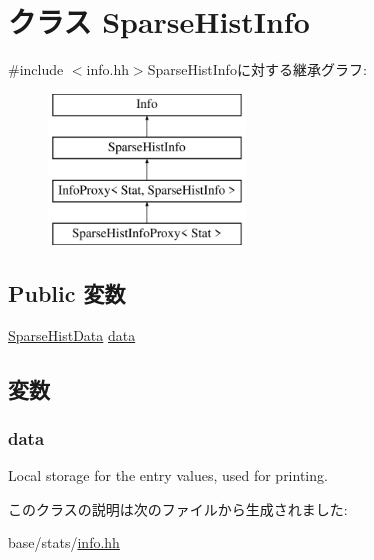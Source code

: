 \hypertarget{classStats_1_1SparseHistInfo}{
\section{クラス SparseHistInfo}
\label{classStats_1_1SparseHistInfo}
}


{\ttfamily \#include $<$info.hh$>$}SparseHistInfoに対する継承グラフ:\begin{figure}[H]
\begin{center}
\leavevmode
\includegraphics[height=4cm]{classStats_1_1SparseHistInfo}
\end{center}
\end{figure}
\subsection*{Public 変数}
\begin{DoxyCompactItemize}
\item 
\hyperlink{structStats_1_1SparseHistData}{SparseHistData} \hyperlink{classStats_1_1SparseHistInfo_a7ef9716232ae99114f53b4f29a9f57bf}{data}
\end{DoxyCompactItemize}


\subsection{変数}
\hypertarget{classStats_1_1SparseHistInfo_a7ef9716232ae99114f53b4f29a9f57bf}{
\subsubsection[{data}]{ {\bf data}}}
\label{classStats_1_1SparseHistInfo_a7ef9716232ae99114f53b4f29a9f57bf}
Local storage for the entry values, used for printing. 

このクラスの説明は次のファイルから生成されました:\begin{DoxyCompactItemize}
\item 
base/stats/\hyperlink{info_8hh}{info.hh}\end{DoxyCompactItemize}
